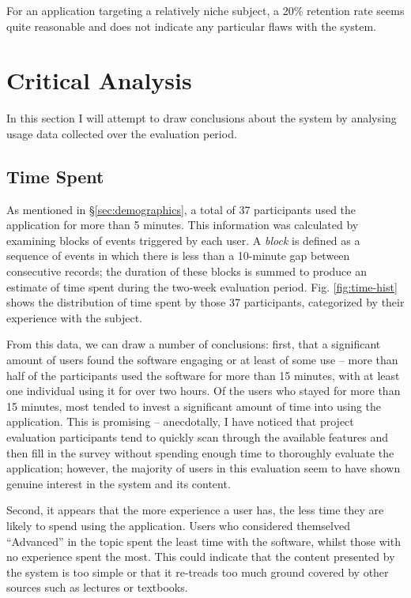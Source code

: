 \documentclass[bsc,twoside,singlespacing,parskip,logo,notimes,normalheadings]{infthesis}
\begin{document}
    For an application targeting a relatively niche subject, a 20\%
    retention rate seems quite reasonable and does not indicate any
    particular flaws with the system.

    \section{Critical Analysis}
    In this section I will attempt to draw conclusions about the
    system by analysing usage data collected over the evaluation
    period.

    \subsection{Time Spent}

    As mentioned in \S\ref{sec:demographics}, a total of 37
    participants used the application for more than 5 minutes. This
    information was calculated by examining blocks of events triggered
    by each user. A {\em block} is defined as a sequence of events in
    which there is less than a 10-minute gap between consecutive
    records; the duration of these blocks is summed to produce an
    estimate of time spent during the two-week evaluation
    period. Fig. \ref{fig:time-hist} shows the distribution of time
    spent by those 37 participants, categorized by their experience
    with the subject.

    From this data, we can draw a number of conclusions: first, that a
    significant amount of users found the software engaging or at
    least of some use -- more than half of the participants used the
    software for more than 15 minutes, with at least one individual
    using it for over two hours. Of the users who stayed for more than
    15 minutes, most tended to invest a significant amount of time
    into using the application. This is promising -- anecdotally, I
    have noticed that project evaluation participants tend to quickly
    scan through the available features and then fill in the survey
    without spending enough time to thoroughly evaluate the
    application; however, the majority of users in this evaluation
    seem to have shown genuine interest in the system and its content.

    Second, it appears that the more experience a user has, the less
    time they are likely to spend using the application. Users who
    considered themselved ``Advanced'' in the topic spent the least
    time with the software, whilst those with no experience spent the
    most. This could indicate that the content presented by the system
    is too simple or that it re-treads too much ground covered by
    other sources such as lectures or textbooks.
\end{document}
